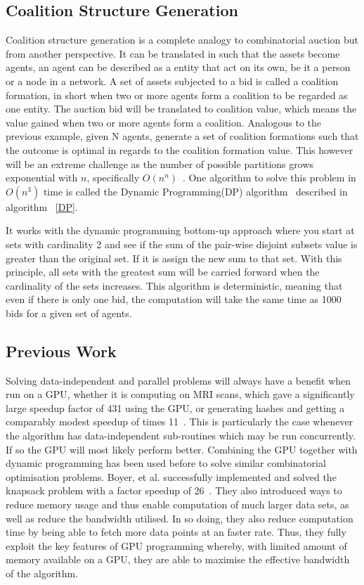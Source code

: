 \documentclass[a4paper, 12pt]{report}
\begin{document}
\subsection{Coalition Structure Generation}
Coalition structure generation is a complete analogy to combinatorial auction
but from another perspective.
It can be translated in such that the assets become agents, 
an agent can be described as a entity that act on its own, be it a person or a
node in a network.
A set of assets subjected to a bid is called a coalition formation, 
in short when two or more agents form a coalition to be regarded as one entity.
The auction bid will be translated to coalition value, 
which means the value gained when two or more agents form a coalition.
Analogous to the previous example, given N agents, 
generate a set of coalition formations such that the outcome is optimal in
regards to the coalition formation value.
This however will be an extreme challenge as the number of possible partitions
grows exponential with $n$, specifically $O(n^n)$~\cite{eps265062}.
One algorithm to solve this problem in $O(n^3)$ time is called the Dynamic
Programming(DP) algorithm~\cite{DPalgorithm} described in
algorithm ~\ref{DP}.

It works with the dynamic programming bottom-up approach where you start at sets
with cardinality 2 and see if the sum of the pair-wise disjoint subsets value is
greater than the original set.
If it is assign the new sum to that set.
With this principle, 
all sets with the greatest sum will be carried forward when the cardinality of
the sets increases.
This algorithm is deterministic, 
meaning that even if there is only one bid, the computation will take the same
time as 1000 bids for a given set of agents. \\

\subsection{Previous Work}
Solving data-independent and parallel problems will always have a benefit when
run on a GPU, 
whether it is computing on MRI scans, which gave a significantly large speedup
factor of 431 using the GPU, 
or generating hashes and getting a comparably modest speedup of times
11~\cite{ryoo2008optimization}.  
This is particularly the case whenever the algorithm has data-independent
sub-routines which may be run concurrently. 
If so the GPU will most likely perform better. 
Combining the GPU together with dynamic programming has been used before to
solve similar combinatorial optimisation problems.  
Boyer, et al. successfully implemented and solved the knapsack problem with a
factor speedup of 26~\cite{boyer2012solving}.  
They also introduced ways to reduce memory usage and thus enable computation of
much larger data sets, as well as reduce the  bandwidth utilised. 
In so doing, they also reduce computation time by being able to fetch more data
points at an faster rate. 
Thus, they fully exploit the key features of GPU programming whereby, with
limited amount of memory available on a GPU,  
they are able to maximise the effective bandwidth of the algorithm.
\end{document}
